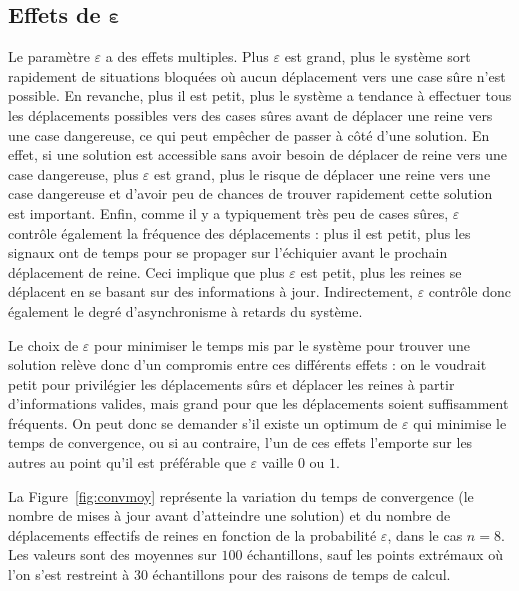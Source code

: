 \subsection{Effets de $\boldsymbol \varepsilon$}



Le paramètre $\varepsilon$ a des effets multiples. Plus $\varepsilon$ est grand, plus le système sort rapidement de situations bloquées où aucun déplacement vers une case sûre n'est possible. En revanche, plus il est petit, plus le système a tendance à effectuer tous les déplacements possibles vers des cases sûres avant de déplacer une reine vers une case dangereuse, ce qui peut empêcher de passer à côté d'une solution. En effet, si une solution est accessible sans avoir besoin de déplacer de reine vers une case dangereuse, plus $\varepsilon$ est grand, plus le risque de déplacer une reine vers une case dangereuse et d'avoir peu de chances de trouver rapidement cette solution est important. Enfin, comme il y a typiquement très peu de cases sûres, $\varepsilon$ contrôle également la fréquence des déplacements : plus il est petit, plus les signaux ont de temps pour se propager sur l'échiquier avant le prochain déplacement de reine. Ceci implique que plus $\varepsilon$ est petit, plus les reines se déplacent en se basant sur des informations à jour. Indirectement, $\varepsilon$ contrôle donc également le degré d'asynchronisme à retards du système. 

Le choix de $\varepsilon$ pour minimiser le temps mis par le système pour trouver une solution relève donc d'un compromis entre ces différents effets : on le voudrait petit pour privilégier les déplacements sûrs et déplacer les reines à partir d'informations valides, mais grand pour que les déplacements soient suffisamment fréquents. On peut donc se demander s'il existe un optimum de $\varepsilon$ qui minimise le temps de convergence, ou si au contraire, l'un de ces effets l'emporte sur les autres au point qu'il est préférable que $\varepsilon$ vaille $0$ ou $1$.

La Figure~\ref{fig:convmoy} représente la variation du temps de convergence (le nombre de mises à jour avant d'atteindre une solution) et du nombre de déplacements effectifs de reines en fonction de la probabilité $\varepsilon$, dans le cas $n=8$. Les valeurs sont des moyennes sur $100$ échantillons, sauf les points extrémaux où l'on s'est restreint à $30$ échantillons pour des raisons de temps de calcul. 

